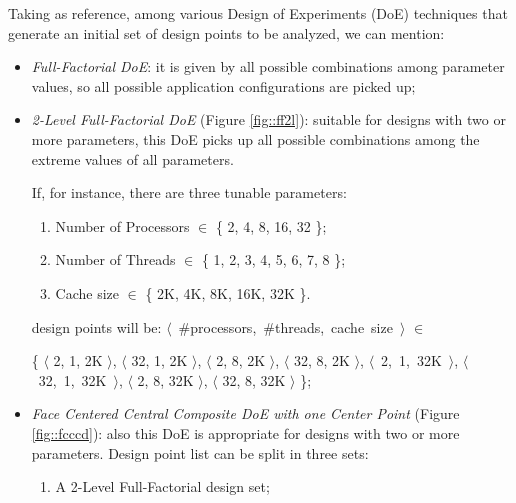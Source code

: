 Taking \cite{natrella2013nist} as reference, among various Design of Experiments (DoE) techniques that generate an initial set of design points to be analyzed, we can mention:

\begin{itemize}

    \item \textit{Full-Factorial DoE}: it is given by all possible combinations among parameter values, so all possible application configurations are picked up;
 
    \item \textit{2-Level Full-Factorial DoE} (Figure \ref{fig::ff2l}): suitable for designs with two or more parameters, this DoE picks up all possible combinations among the extreme values of all parameters.
    
    If, for instance, there are three tunable parameters:
    
    \begin{enumerate}
    
        \item Number of Processors $\in$ \{ 2, 4, 8, 16, 32 \};
        
        \item Number of Threads $\in$ \{ 1, 2, 3, 4, 5, 6, 7, 8 \};
        
        \item Cache size $\in$ \{ 2K, 4K, 8K, 16K, 32K \}.
    
    \end{enumerate}
    
    design points will be: \hbox{$\langle$ \#processors, \#threads, cache size $\rangle$} $\in$
    
    \{ $\langle$ 2, 1, 2K $\rangle$, $\langle$ 32, 1, 2K $\rangle$, $\langle$ 2, 8, 2K $\rangle$, $\langle$ 32, 8, 2K $\rangle$, \hbox{$\langle$ 2, 1, 32K $\rangle$}, \hbox{$\langle$ 32, 1, 32K $\rangle$}, $\langle$ 2, 8, 32K $\rangle$, $\langle$ 32, 8, 32K $\rangle$ \};

    \item \textit{Face Centered Central Composite DoE with one Center Point} (Figure \ref{fig::fcccd}): also this DoE is appropriate for designs with two or more parameters. Design point list can be split in three sets:
    
     \begin{enumerate}
    
        \item A 2-Level Full-Factorial design set;
        

\end{enumerate}
\end{itemize}
